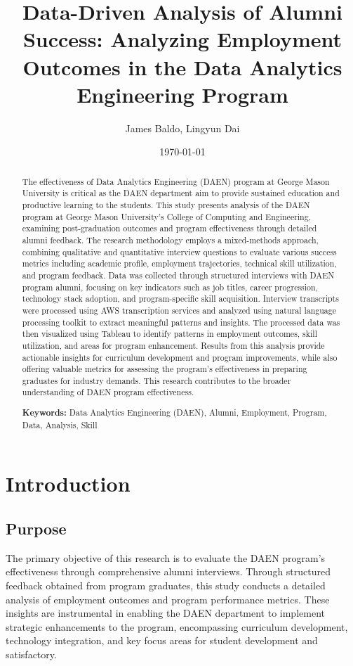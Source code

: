 \documentclass[12pt,a4paper]{article}
\title{\textbf{Data-Driven Analysis of Alumni Success: Analyzing Employment Outcomes in the Data Analytics Engineering Program}}
\author{James Baldo, Lingyun Dai}
\date{\today}
\begin{document}
\maketitle

\begin{abstract}
The effectiveness of Data Analytics Engineering (DAEN) program at George 
Mason University is critical as the DAEN department aim to provide 
sustained education and productive learning to the students.
This study presents analysis of the DAEN program at George Mason 
University's College of Computing and Engineering, examining post-graduation outcomes and 
program effectiveness through detailed alumni feedback. The 
research methodology employs a mixed-methods approach, combining 
qualitative and quantitative interview questions to evaluate 
various success metrics including academic profile, employment 
trajectories, technical skill utilization, and program feedback. Data was 
collected through structured interviews with DAEN program alumni, 
focusing on key indicators such as job titles, career progression, 
technology stack adoption, and program-specific skill acquisition. 
Interview transcripts were processed using AWS transcription services 
and analyzed using natural language processing toolkit to extract 
meaningful patterns and insights. The processed data was then 
visualized using Tableau to identify patterns in employment outcomes, 
skill utilization, and areas for program enhancement. Results from 
this analysis provide actionable insights for curriculum development 
and program improvements, while also offering valuable metrics for 
assessing the program's effectiveness in preparing graduates for 
industry demands. This research contributes to the broader 
understanding of DAEN program effectiveness.

\textbf{Keywords:} Data Analytics Engineering (DAEN), 
Alumni, Employment, Program, Data, Analysis, Skill
\end{abstract}

\newpage
\tableofcontents
\newpage

\section{Introduction}
\subsection{Purpose}
The primary objective of this research is to evaluate the DAEN 
program's effectiveness through comprehensive alumni interviews. Through structured feedback 
obtained from program graduates, this study conducts a 
detailed analysis of employment outcomes and program performance 
metrics. These insights are instrumental in enabling the DAEN 
department to implement strategic enhancements to the program, 
encompassing curriculum development, technology integration, 
and key focus areas for student development and satisfactory.
\end{document}
